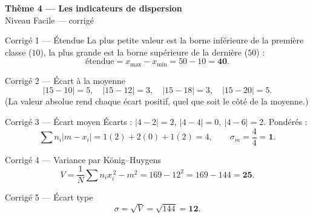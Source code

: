 \documentclass[11pt,a4paper]{article}
\newcommand{\bandeau}[2]{%
\begin{tcolorbox}[boxbase,colback=primary,colframe=primarydark,halign=center,
   before skip=2pt,after skip=12pt]
{\LARGE\bfseries\color{white} #1}\\[3pt]{\normalsize\color{white} #2}
\end{tcolorbox}}
\newcommand{\ecm}{\sigma_m}
\newcommand{\ect}{\sigma}
\begin{document}
\bandeau{Thème 4 — Les indicateurs de dispersion}{Niveau Facile — corrigé}

\begin{corbox}{Corrigé 1 — Étendue}
La plus petite valeur est la borne inférieure de la première classe ($10$), la plus grande est la
borne supérieure de la dernière ($50$) :
\[ \text{étendue}=x_{\max}-x_{\min}=50-10=\mathbf{40}. \]
\end{corbox}

\begin{corbox}{Corrigé 2 — Écart à la moyenne}
\[
|15-10|=5,\quad |15-12|=3,\quad |15-18|=3,\quad |15-20|=5.
\]
(La valeur absolue rend chaque écart positif, quel que soit le côté de la moyenne.)
\end{corbox}

\begin{corbox}{Corrigé 3 — Écart moyen}
Écarts : $|4-2|=2,\ |4-4|=0,\ |4-6|=2$. Pondérés :
\[ \sum n_i|m-x_i|=1(2)+2(0)+1(2)=4,\qquad \ecm=\frac{4}{4}=\mathbf{1}. \]
\end{corbox}

\begin{corbox}{Corrigé 4 — Variance par König--Huygens}
\[ V=\frac{1}{N}\sum n_i x_i^{\,2}-m^2=169-12^2=169-144=\mathbf{25}. \]
\end{corbox}

\begin{corbox}{Corrigé 5 — Écart type}
\[ \ect=\sqrt{V}=\sqrt{144}=\mathbf{12}. \]
\end{corbox}
\end{document}
